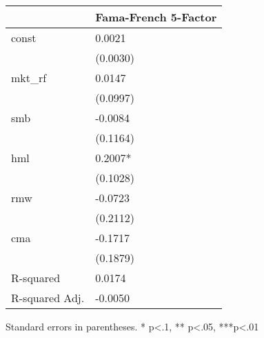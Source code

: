 \begin{table}
\caption{}
\label{}
\begin{center}
\begin{tabular}{ll}
\hline
               & Fama-French 5-Factor  \\
\hline
const          & 0.0021                \\
               & (0.0030)              \\
mkt\_rf        & 0.0147                \\
               & (0.0997)              \\
smb            & -0.0084               \\
               & (0.1164)              \\
hml            & 0.2007*               \\
               & (0.1028)              \\
rmw            & -0.0723               \\
               & (0.2112)              \\
cma            & -0.1717               \\
               & (0.1879)              \\
R-squared      & 0.0174                \\
R-squared Adj. & -0.0050               \\
\hline
\end{tabular}
\end{center}
\end{table}
\bigskip
Standard errors in parentheses. \newline 
* p<.1, ** p<.05, ***p<.01